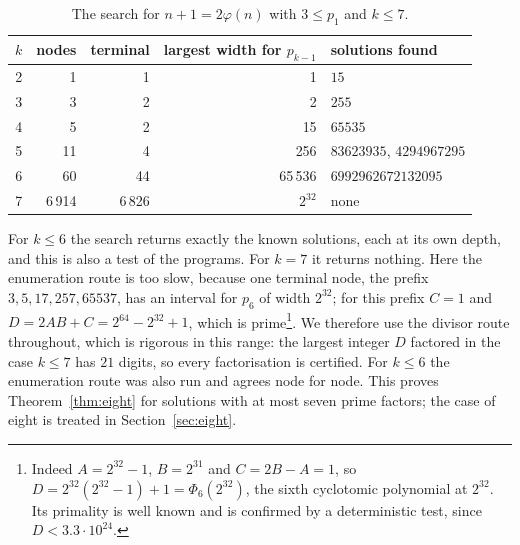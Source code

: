 \documentclass[screen,reqno]{aomart}
\numberwithin{equation}{section}
\theoremstyle{plain}
\theoremstyle{definition}
\theoremstyle{remark}
\begin{document}
\begin{table}[ht]
\centering
\caption{The search for $n+1=2\varphi(n)$ with $3\le p_1$ and $k\le7$.}
\label{tab:seven}
\smallskip
\begin{tabular}{@{}rrrrl@{}}
\toprule
$k$ & nodes & terminal & largest width for $p_{k-1}$ & solutions found \\
\midrule
2 &     1 &     1 &                 1 & $15$ \\
3 &     3 &     2 &                 2 & $255$ \\
4 &     5 &     2 &                15 & $65535$ \\
5 &    11 &     4 &               256 & $83623935$, $4294967295$ \\
6 &    60 &    44 &            65\,536 & $6992962672132095$ \\
7 & 6\,914 & 6\,826 &          $2^{32}$ & none \\
\bottomrule
\end{tabular}
\end{table}

For $k\le6$ the search returns exactly the known solutions, each at
its own depth, and this is also a test of the programs. For $k=7$ it
returns nothing. Here the enumeration route is too slow, because one
terminal node, the prefix $3,5,17,257,65537$, has an interval for
$p_6$ of width $2^{32}$; for this prefix $C=1$ and
$D=2AB+C=2^{64}-2^{32}+1$, which is prime\footnote{Indeed
$A=2^{32}-1$, $B=2^{31}$ and $C=2B-A=1$, so
$D=2^{32}(2^{32}-1)+1=\Phi_6(2^{32})$, the sixth cyclotomic polynomial
at $2^{32}$. Its primality is well known and is confirmed by a
deterministic test, since $D<3.3\cdot10^{24}$.}. We
therefore use the divisor route throughout, which is rigorous in this
range: the largest integer $D$ factored in the case $k\le7$ has $21$
digits, so every factorisation is certified. For $k\le6$ the
enumeration route was also run and agrees node for node. This proves
Theorem~\ref{thm:eight} for solutions with at most seven prime
factors; the case of eight is treated in Section~\ref{sec:eight}.
\end{document}
